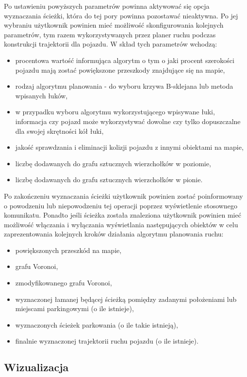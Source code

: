 \documentclass[a4paper,11pt,twoside]{report}
\theoremstyle{definition}
\begin{document}
Po ustawieniu powyższych parametrów powinna aktywować się opcja wyznaczania ścieżki, która do tej pory powinna pozostawać nieaktywna. Po jej wybraniu użytkownik powinien mieć możliwość skonfigurowania kolejnych parametrów, tym razem wykorzystywanych przez planer ruchu podczas konstrukcji trajektorii dla pojazdu. W skład tych parametrów wchodzą:
\begin{itemize}
	\item procentowa wartość informująca algorytm o tym o jaki procent szerokości pojazdu mają zostać powiększone przeszkody znajdujące się na mapie,
	\item rodzaj algorytmu planowania - do wyboru krzywa B-sklejana lub metoda wpisanych łuków,
	\item w przypadku wyboru algorytmu wykorzystującego wpisywane łuki, informacja czy pojazd może wykorzystywać dowolne czy tylko dopuszczalne dla swojej skrętności kół łuki,
	\item jakość sprawdzania i eliminacji kolizji pojazdu z innymi obiektami na mapie,
	\item liczbę dodawanych do grafu sztucznych wierzchołków w poziomie,
	\item liczbę dodawanych do grafu sztucznych wierzchołków w pionie.
\end{itemize}

Po zakończeniu wyznaczania ścieżki użytkownik powinien zostać poinformowany o powodzeniu lub niepowodzeniu tej operacji poprzez wyświetlenie stosownego komunikatu. Ponadto jeśli ścieżka została znaleziona użytkownik powinien mieć możliwość włączania i wyłączania wyświetlania następujących obiektów w celu zaprezentowania kolejnych kroków działania algorytmu planowania ruchu:
\begin{itemize}
	\item powiększonych przeszkód na mapie,
	\item grafu Voronoi,
	\item zmodyfikowanego grafu Voronoi,
	\item wyznaczonej łamanej będącej ścieżką pomiędzy zadanymi położeniami lub miejscami parkingowymi (o ile istnieje),
	\item wyznaczonych ścieżek parkowania (o ile takie istnieją),
	\item finalnie wyznaczonej trajektorii ruchu pojazdu (o ile istnieje).
\end{itemize}

\subsection{Wizualizacja}
\end{document}

